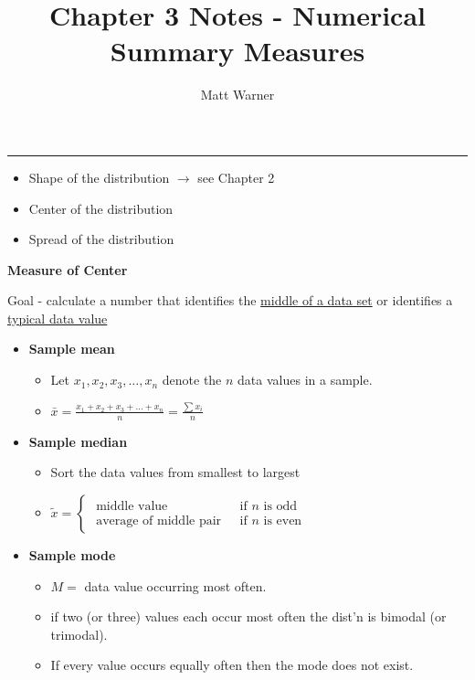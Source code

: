 \documentclass{report}
\title{\Huge{Chapter 3 Notes - Numerical Summary Measures}}
\author{\huge{Matt Warner}}
\date{\huge{}}
\begin{document}
  \maketitle

\hrule
\bigbreak \noindent
\begin{itemize}
  \item Shape of the distribution $\rightarrow$ see Chapter 2 
  \item Center of the distribution
  \item Spread of the distribution
\end{itemize}
\bigbreak \noindent
\begin{large}
  \textbf{Measure of Center}
\end{large}
\bigbreak \noindent
Goal - calculate a number that identifies the \underline{middle of a data set} or identifies a \underline{typical data value}
\bigbreak \noindent
\begin{itemize}
  \item \textbf{Sample mean}
    \begin{itemize}
      \item Let $ x_1, x_2, x_3, \ldots, x_n$ denote the $n$ data values in a sample. 
      \item $\bar{x} = \frac{x_1+x_2+x_3+\ldots+ x_n}{n} = \frac{\sum{x_i}}{n}$
    \end{itemize}
\end{itemize}
\begin{itemize}
  \item \textbf{Sample median} 
    \begin{itemize}
      \item Sort the data values from smallest to largest 
      \item $\tilde{x}= \begin{cases}\text { middle value } & \text { if } n \text { is odd } \\ \text { average of middle pair } & \text { if } n \text { is even }\end{cases}$ 
    \end{itemize}
\end{itemize}
\begin{itemize}
  \item \textbf{Sample mode}
    \begin{itemize}
  \item $M =$ data value occurring most often.
  \item if two (or three) values each occur most often the dist'n is bimodal (or trimodal).
  \item If every value occurs equally often then the mode does not exist.
  \end{itemize}
\end{itemize}
\end{document}
